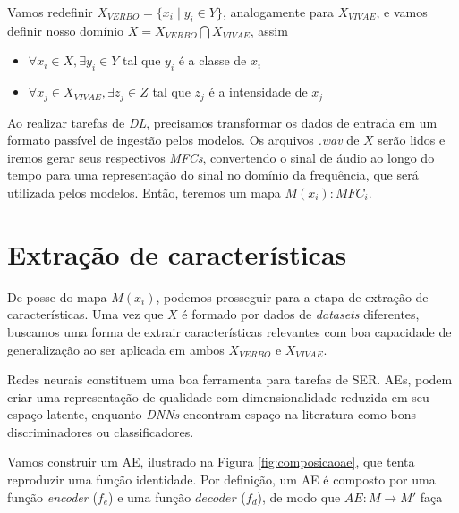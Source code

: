 Vamos redefinir $X_{VERBO} = \{x_i \mid y_i \in Y\}$, analogamente para $X_{VIVAE}$, e vamos definir nosso domínio $X = X_{VERBO} \bigcap X_{VIVAE}$, assim

\begin{itemize}
    \item $\forall x_i \in X, \exists y_i \in Y$ tal que  $y_i$ é a classe de $x_i$
    \item $\forall x_j \in X_{VIVAE}, \exists z_j \in Z$ tal que  $z_j$ é a intensidade de $x_j$
\end{itemize}

Ao realizar tarefas de \textit{DL}, precisamos transformar os dados de entrada em um formato passível de ingestão pelos modelos. Os arquivos \textit{.wav} de $X$ serão lidos e iremos gerar seus respectivos \textit{MFCs}, convertendo o sinal de áudio ao longo do tempo para uma representação do sinal no domínio da frequência, que será utilizada pelos modelos. Então, teremos um mapa $M(x_i): MFC_i$.


\section{Extração de características}

De posse do mapa $M(x_i)$, podemos prosseguir para a etapa de extração de características. Uma vez que $X$ é formado por dados de \textit{datasets} diferentes, buscamos uma forma de extrair características relevantes com boa capacidade de generalização ao ser aplicada em ambos $X_{VERBO}$ e $X_{VIVAE}$.


Redes neurais constituem uma boa ferramenta para tarefas de \acrshort{SER}. \acrlong{AE}s, podem criar uma representação de qualidade com dimensionalidade reduzida em seu espaço latente, enquanto \textit{DNNs} encontram espaço na literatura como bons discriminadores ou classificadores.

Vamos construir um \acrshort{AE}, ilustrado na Figura \ref{fig:composicaoae}, que tenta reproduzir uma função identidade. Por definição, um \acrlong{AE} é composto por uma função \textit{encoder} ($f_e$) e uma função $decoder$ ($f_d$), de modo que $AE: M \rightarrow M'$ faça

